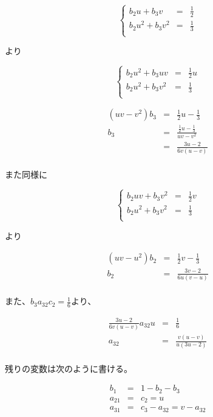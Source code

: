 \[
\left\{
\begin{array}{lcl}
b_2 u + b_3 v & = & \frac{1}{2}\\ 
b_2 u^2 + b_3 v^2 & = & \frac{1}{3}\\ 
\end{array}
\right.
\]

より

\[
\left\{
\begin{array}{lcl}
b_2 u^2 + b_3 uv & = & \frac{1}{2}u\\ 
b_2 u^2 + b_3 v^2 & = & \frac{1}{3}\\ 
\end{array}
\right.
\]

\begin{eqnarray*}
(uv-v^2) b_3 & = & \frac{1}{2}u -\frac{1}{3}\\
b_3 & = & \frac{\frac{1}{2}u-\frac{1}{3}}{uv-v^2}\\
    & = & \frac{3u-2}{6v(u-v)}\\
\end{eqnarray*}

また同様に

\[
\left\{
\begin{array}{lcl}
b_2 uv + b_3 v^2 & = & \frac{1}{2}v\\ 
b_2 u^2 + b_3 v^2 & = & \frac{1}{3}\\ 
\end{array}
\right.
\]

より

\begin{eqnarray*}
(uv-u^2) b_2 & = & \frac{1}{2}v -\frac{1}{3}\\
b_2 & = & \frac{3v-2}{6u(v-u)}\\
\end{eqnarray*}

また、\(\displaystyle{b_3a_{32}c_2=\frac{1}{6}}\)より、

\begin{eqnarray*}
\frac{3u-2}{6v(u-v)} a_{32}u & = & \frac{1}{6}\\
a_{32} & = & \frac{v(u-v)}{u(3u-2)}\\ 
\end{eqnarray*}

残りの変数は次のように書ける。

\begin{eqnarray*}
b_1 & = & 1 - b_2 - b_3 \\
a_{21} & = & c_2 = u \\
a_{31} & = & c_3 - a_{32} = v - a_{32} \\ 
\end{eqnarray*}

